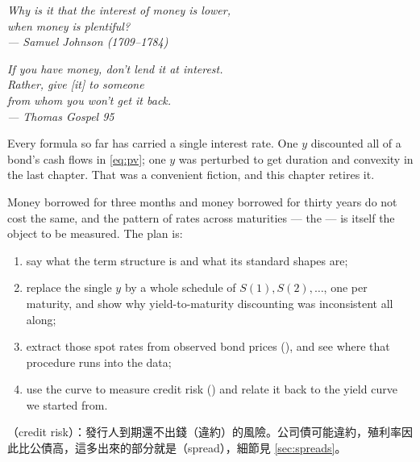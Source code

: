 \begin{flushright}
	\itshape Why is it that the interest of money is lower,\\
	when money is plentiful?\\
	\upshape --- Samuel Johnson (1709--1784)

	\medskip

	\itshape If you have money, don't lend it at interest.\\
	Rather, give [it] to someone\\
	from whom you won't get it back.\\
	\upshape --- Thomas Gospel 95
\end{flushright}

\bigskip

\suppstart
\noindent Every formula so far has carried a single interest rate.
One $y$ discounted all of a bond's cash flows in \eqref{eq:pv}; one $y$ was perturbed to get duration and convexity in the last chapter.
That was a convenient fiction, and this chapter retires it.

Money borrowed for three months and money borrowed for thirty years do not cost the same, and the pattern of rates across maturities --- the  --- is itself the object to be measured.
The plan is:

\begin{enumerate}[nosep, label=(\arabic*)]
	\item say what the term structure is and what its standard shapes are;
	\item replace the single $y$ by a whole schedule of  $S(1),S(2),\dots$, one per maturity, and show why yield-to-maturity discounting was inconsistent all along;
	\item extract those spot rates from observed bond prices (), and see where that procedure runs into the data;
	\item use the curve to measure credit risk () and relate it back to the yield curve we started from.
\end{enumerate}

\begin{remark}
	（credit risk）：發行人到期還不出錢（違約）的風險。公司債可能違約，殖利率因此比公債高，這多出來的部分就是（spread），細節見 \autoref{sec:spreads}。
\end{remark}
\suppend

